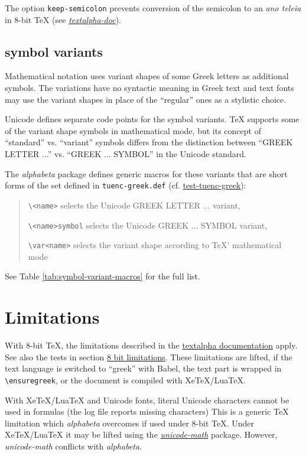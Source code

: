 \documentclass{article}
\begin{document}
The option \texttt{keep-semicolon} prevents conversion of the
semicolon to an \emph{ano teleia} in 8-bit TeX
(see \emph{\href{textalpha-doc.pdf}{textalpha-doc}}).

\subsection{symbol variants}

Mathematical notation uses variant shapes of some Greek letters as
additional symbols. The variations have no syntactic meaning in Greek text
and text fonts may use the variant shapes in place of the “regular” ones as
a stylistic choice.

Unicode defines separate code points for the symbol variants. TeX supports
some of the variant shape symbols in mathematical mode, but its concept of
“standard” vs. “variant” symbols differs from the distinction between
“GREEK LETTER ...” vs. “GREEK ... SYMBOL” in the Unicode standard.

The \emph{alphabeta} package defines generic macros for these variants that
are short forms of the set defined in \texttt{tuenc-greek.def}
(cf. \href{test-tuenc-greek.pdf}{test-tuenc-greek}):
\begin{quote}
  \verb|\<name>| selects the Unicode GREEK LETTER ... variant,

  \verb|\<name>symbol| selects the Unicode
     GREEK ... SYMBOL variant,

  \verb|\var<name>| selects the variant
    shape according to TeX' mathematical mode
\end{quote}
See Table \ref{tab:symbol-variant-macros} for the full list.

\section{Limitations \label{sec:limitations}}

With 8-bit TeX, the limitations described in the
\href{textalpha-doc.pdf}{textalpha documentation} apply. See also the tests
in section \hyperref[sec:8-bit-limitations]{8 bit limitations}.
These limitations are lifted, if the text language is switched to ``greek''
with Babel, the text part is wrapped in \verb+\ensuregreek+, or the
document is compiled with XeTeX/LuaTeX.

With XeTeX/LuaTeX and Unicode fonts, literal Unicode characters cannot be
used in formulas (the log file reports missing characters) This is a generic
TeX limitation which \emph{alphabeta} overcomes if used under 8-bit TeX.
Under XeTeX/LuaTeX it may be lifted using the
\href{http://www.ctan.org/pkg/unicode-math}{\emph{unicode-math}} package.
However, \emph{unicode-math} conflicts with \emph{alphabeta}.
\end{document}
